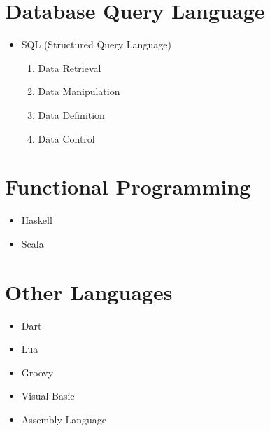 \documentclass{article}
\begin{document}
\section{Database Query Language}

\begin{itemize}
    \item SQL (Structured Query Language)
    \begin{enumerate}[label=\Alph*.]
        \item Data Retrieval
        \item Data Manipulation
        \item Data Definition
        \item Data Control
    \end{enumerate}
\end{itemize}

\section{Functional Programming}

\begin{itemize}
    \item Haskell
    \item Scala
\end{itemize}

\section{Other Languages}

\begin{itemize}
    \item Dart
    \item Lua
    \item Groovy
    \item Visual Basic
    \item Assembly Language
\end{itemize}
\end{document}
